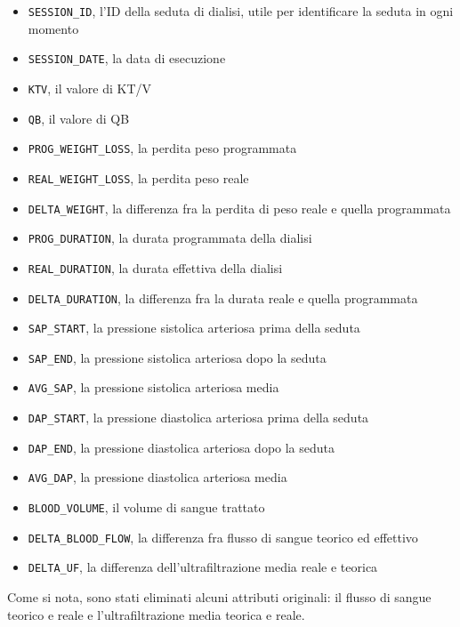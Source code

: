 \documentclass[preprint]{acm_proc_article-sp}
\begin{document}
\begin{itemize}
\item \verb|SESSION_ID|, l'ID della seduta di dialisi, utile per identificare la seduta in ogni momento
\item \verb|SESSION_DATE|, la data di esecuzione
\item \verb|KTV|, il valore di KT/V
\item \verb|QB|, il valore di QB
\item \verb|PROG_WEIGHT_LOSS|, la perdita peso programmata
\item \verb|REAL_WEIGHT_LOSS|, la perdita peso reale
\item \verb|DELTA_WEIGHT|, la differenza fra la perdita di peso reale e quella programmata
\item \verb|PROG_DURATION|, la durata programmata della dialisi
\item \verb|REAL_DURATION|, la durata effettiva della dialisi
\item \verb|DELTA_DURATION|, la differenza fra la durata reale e quella programmata
\item \verb|SAP_START|, la pressione sistolica arteriosa prima della seduta
\item \verb|SAP_END|, la pressione sistolica arteriosa dopo la seduta
\item \verb|AVG_SAP|, la pressione sistolica arteriosa media
\item \verb|DAP_START|, la pressione diastolica arteriosa prima della seduta
\item \verb|DAP_END|, la pressione diastolica arteriosa dopo la seduta
\item \verb|AVG_DAP|, la pressione diastolica arteriosa media
\item \verb|BLOOD_VOLUME|, il volume di sangue trattato
\item \verb|DELTA_BLOOD_FLOW|, la differenza fra flusso di sangue teorico ed effettivo
\item \verb|DELTA_UF|, la differenza dell'ultrafiltrazione media reale e teorica
\end{itemize}

Come si nota, sono stati eliminati alcuni attributi originali: il flusso di sangue teorico e reale e l'ultrafiltrazione media teorica e reale.
\end{document}
